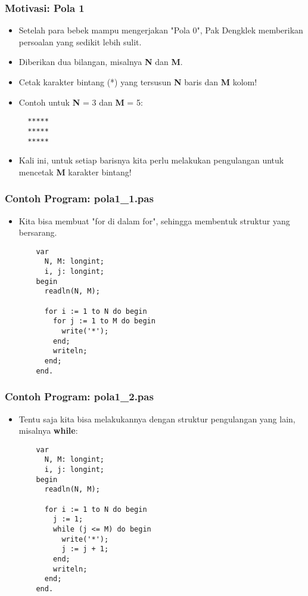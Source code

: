 \begin{frame}[fragile]
\frametitle{Motivasi: Pola 1}
\begin{itemize}
  \item Setelah para bebek mampu mengerjakan "Pola 0", Pak Dengklek memberikan persoalan yang sedikit lebih sulit.
  \item Diberikan dua bilangan, misalnya \textbf{N} dan \textbf{M}.
  \item Cetak karakter bintang (*) yang tersusun \textbf{N} baris dan \textbf{M} kolom!

  \item Contoh untuk \textbf{N} = 3 dan \textbf{M} = 5:
  \begin{lstlisting}
  *****
  *****
  *****
  \end{lstlisting}

  \item Kali ini, untuk setiap barisnya kita perlu melakukan pengulangan untuk mencetak \textbf{M} karakter bintang!
\end{itemize}
\end{frame}

\begin{frame}[fragile]
\frametitle{Contoh Program: pola1\_1.pas}
\begin{itemize}
  \item Kita bisa membuat "for di dalam for", sehingga membentuk struktur yang bersarang.
  \begin{lstlisting}
    var
      N, M: longint;
      i, j: longint;
    begin
      readln(N, M);

      for i := 1 to N do begin
        for j := 1 to M do begin
          write('*');
        end;
        writeln;
      end;
    end.
  \end{lstlisting}
\end{itemize}
\end{frame}

\begin{frame}[fragile]
\frametitle{Contoh Program: pola1\_2.pas}
\begin{itemize}
  \item Tentu saja kita bisa melakukannya dengan struktur pengulangan yang lain, misalnya \textbf{while}:
  \begin{lstlisting}
    var
      N, M: longint;
      i, j: longint;
    begin
      readln(N, M);

      for i := 1 to N do begin
        j := 1;
        while (j <= M) do begin
          write('*');
          j := j + 1;
        end;
        writeln;
      end;
    end.
  \end{lstlisting}
\end{itemize}
\end{frame}

